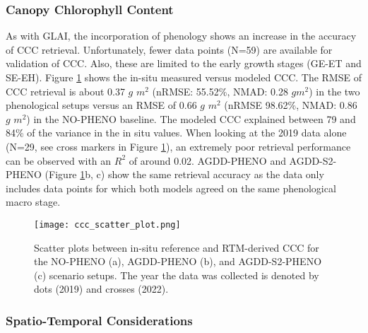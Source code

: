 \subsubsection{Canopy Chlorophyll Content}

As with GLAI, the incorporation of phenology shows an increase in the accuracy of CCC retrieval. Unfortunately, fewer data points (N=59) are available for validation of CCC. Also, these are limited to the early growth stages (GE-ET and SE-EH). Figure \ref{fig:ccc-val-scatter} shows the in-situ measured versus modeled CCC. The RMSE of CCC retrieval is about 0.37 $g$ $m^2$ (nRMSE: 55.52\%, NMAD: 0.28 $gm^2$) in the two phenological setups versus an RMSE of 0.66 $g$ $m^2$ (nRMSE 98.62\%, NMAD: 0.86 $g$ $m^2$) in the NO-PHENO baseline. The modeled CCC explained between 79 and 84\% of the variance in the in situ values. When looking at the 2019 data alone (N=29, see cross markers in Figure \ref{fig:ccc-val-scatter}), an extremely poor retrieval performance can be observed with an $R^2$ of around 0.02. AGDD-PHENO and AGDD-S2-PHENO (Figure \ref{fig:ccc-val-scatter}b, c) show the same retrieval accuracy as the data only includes data points for which both models agreed on the same phenological macro stage.

\begin{figure}[H]
    \centering
    \texttt{[image: ccc\_scatter\_plot.png]}
    \caption[Scatter plots between in-situ reference and RTM-derived CCC for the NO-PHENO (a), AGDD-PHENO (b), and AGDD-S2-PHENO (c) scenario setups. The year the data was collected is denoted by dots (2019) and crosses (2022).]{Scatter plots between in-situ reference and RTM-derived CCC for the NO-PHENO (a), AGDD-PHENO (b), and AGDD-S2-PHENO (c) scenario setups. The year the data was collected is denoted by dots (2019) and crosses (2022).}
    \label{fig:ccc-val-scatter}
\end{figure}


\subsubsection{Spatio-Temporal Considerations}

